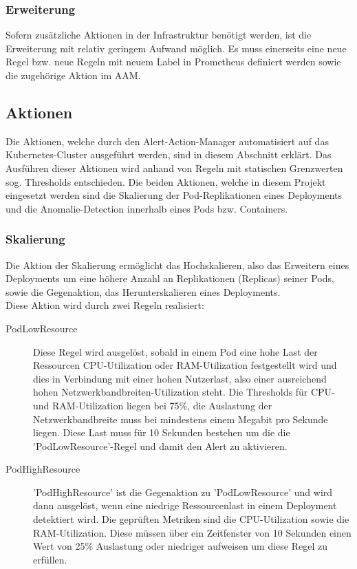 \documentclass[a4paper,10pt]{scrartcl}
\begin{document}
\subsubsection{Erweiterung}

Sofern zusätzliche Aktionen in der Infrastruktur benötigt werden, ist die Erweiterung mit relativ geringem Aufwand möglich. Es muss einerseits eine neue Regel bzw. neue Regeln mit neuem Label in Prometheus definiert werden sowie die zugehörige Aktion im AAM.

\subsection{Aktionen}

Die Aktionen, welche durch den Alert-Action-Manager automatisiert auf das Kubernetes-Cluster ausgeführt werden, sind in diesem Abschnitt erklärt. Das Ausführen dieser Aktionen wird anhand von Regeln mit statischen Grenzwerten sog. Thresholds entschieden.
Die beiden Aktionen, welche in diesem Projekt eingesetzt werden sind die Skalierung der Pod-Replikationen eines Deployments und die Anomalie-Detection innerhalb eines Pods bzw. Containers.

\subsubsection{Skalierung}

Die Aktion der Skalierung ermöglicht das Hochskalieren, also das Erweitern eines Deployments um eine höhere Anzahl an Replikationen (Replicas) seiner Pods, sowie die Gegenaktion, das Herunterskalieren eines Deployments.\\
Diese Aktion wird durch zwei Regeln realisiert:

\begin{description}
\item[PodLowResource]

Diese Regel wird ausgelöst, sobald in einem Pod eine hohe Last der Ressourcen CPU-Utilization oder RAM-Utilization festgestellt wird und dies in Verbindung mit einer hohen Nutzerlast, also einer ausreichend hohen Netzwerkbandbreiten-Utilization steht. Die Thresholds für CPU- und RAM-Utilization liegen bei 75\%, die Auslastung der Netzwerkbandbreite muss bei mindestens einem Megabit pro Sekunde liegen. Diese Last muss für 10 Sekunden bestehen um die die 'PodLowResource'-Regel und damit den Alert zu aktivieren.

\item[PodHighResource]

'PodHighResource' ist die Gegenaktion zu 'PodLowResource' und wird dann ausgelöst, wenn 
eine niedrige Ressourcenlast in einem Deployment detektiert wird. Die geprüften Metriken sind die CPU-Utilization sowie die RAM-Utilization. Diese müssen über ein Zeitfenster von 10 Sekunden einen Wert von 25\% Auslastung oder niedriger aufweisen um diese Regel zu erfüllen.

\end{description}
\end{document}
